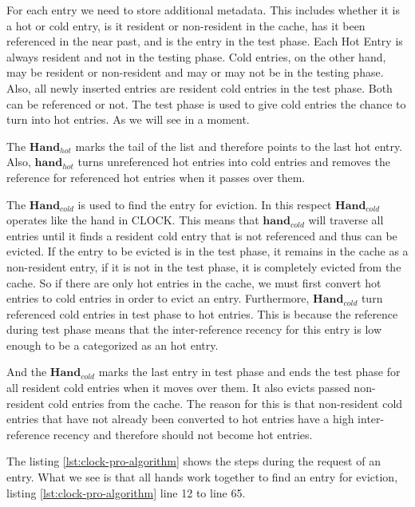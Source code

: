 \documentclass[
	12pt,
	a4paper,
	abstract,
	bibliography=totoc,
	chapterprefix,
	headings=openright,
	numbers=endperiod,
	parskip=half,
	twoside,
]{scrreprt}
\begin{document}
For each entry we need to store additional metadata. This includes whether it is a hot or cold entry, is it resident or non-resident in the cache, has it been referenced in the near past, and is the entry in the test phase.
Each Hot Entry is always resident and not in the testing phase.
Cold entries, on the other hand, may be resident or non-resident and may or may not be in the testing phase.
Also, all newly inserted entries are resident cold entries in the test phase.
Both can be referenced or not.
The test phase is used to give cold entries the chance to turn into hot entries.
As we will see in a moment.

The $\textbf{Hand}_{hot}$ marks the tail of the list and therefore points to the last hot entry.
Also, $\textbf{hand}_{hot}$ turns unreferenced hot entries into cold entries  and removes the reference for referenced hot entries when it passes over them.


The $\textbf{Hand}_{cold}$ is used to find the entry for eviction. 
In this respect $\textbf{Hand}_{cold}$ operates like the hand in CLOCK.
This means that $\textbf{hand}_{cold}$ will traverse all entries until it finds a resident cold entry that is not referenced and thus can be evicted.
If the entry to be evicted is in the test phase, it remains in the cache as a non-resident entry, if it is not in the test phase, it is completely evicted from the cache.
So if there are only hot entries in the cache,  
we must first convert hot entries to cold entries in order to evict an entry.
Furthermore, $\textbf{Hand}_{cold}$ turn referenced cold entries in test phase to hot entries. 
This is because the reference during test phase means that the inter-reference recency for this entry is low enough to be a categorized as an hot entry.

And the $\textbf{Hand}_{cold}$ marks the last entry in test phase and ends the test phase for all resident cold entries when it moves over them. 
It also evicts passed non-resident cold entries from the cache.
The reason for this is that non-resident cold entries that have not already been converted to hot entries have a high inter-reference recency 
and therefore should not become hot entries.

The listing \ref{lst:clock-pro-algorithm} shows the steps during the request of an entry.
What we see is that all hands work together to find an entry for eviction, listing \ref{lst:clock-pro-algorithm} line 12 to line 65.

\bigskip
\end{document}
